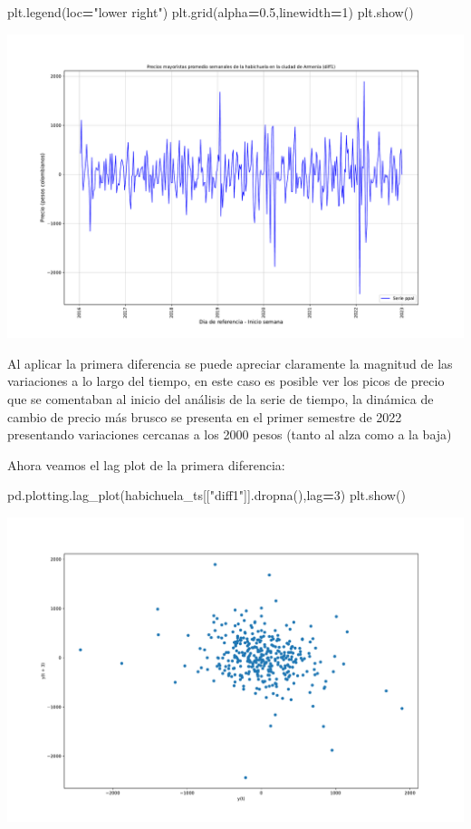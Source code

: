 \documentclass[
]{book}
\newenvironment{Shaded}{\begin{snugshade}}{\end{snugshade}}
\newcommand{\DecValTok}[1]{\textcolor[rgb]{0.00,0.00,0.81}{#1}}
\newcommand{\FloatTok}[1]{\textcolor[rgb]{0.00,0.00,0.81}{#1}}
\newcommand{\NormalTok}[1]{#1}
\newcommand{\OperatorTok}[1]{\textcolor[rgb]{0.81,0.36,0.00}{\textbf{#1}}}
\newcommand{\StringTok}[1]{\textcolor[rgb]{0.31,0.60,0.02}{#1}}
\begin{document}
\begin{Shaded}
\begin{Highlighting}[]
\NormalTok{plt.legend(loc}\OperatorTok{=}\StringTok{"lower right"}\NormalTok{)}
\NormalTok{plt.grid(alpha}\OperatorTok{=}\FloatTok{0.5}\NormalTok{,linewidth}\OperatorTok{=}\DecValTok{1}\NormalTok{)}
\NormalTok{plt.show()}
\end{Highlighting}
\end{Shaded}

\includegraphics{bookdown-demo_files/figure-latex/unnamed-chunk-70-37.pdf}

Al aplicar la primera diferencia se puede apreciar claramente la magnitud de las variaciones a lo largo del tiempo, en este caso es posible ver los picos de precio que se comentaban al inicio del análisis de la serie de tiempo, la dinámica de cambio de precio más brusco se presenta en el primer semestre de 2022 presentando variaciones cercanas a los 2000 pesos (tanto al alza como a la baja)

Ahora veamos el lag plot de la primera diferencia:

\begin{Shaded}
\begin{Highlighting}[]

\NormalTok{pd.plotting.lag\_plot(habichuela\_ts[[}\StringTok{"diff1"}\NormalTok{]].dropna(),lag}\OperatorTok{=}\DecValTok{3}\NormalTok{)}
\NormalTok{plt.show()}
\end{Highlighting}
\end{Shaded}

\includegraphics{bookdown-demo_files/figure-latex/unnamed-chunk-71-39.pdf}
\end{document}
